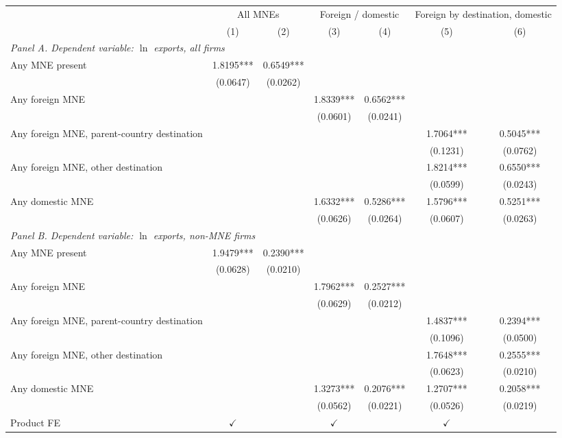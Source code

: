 \begin{tabular}{lcccccc} \hline
 & \multicolumn{2}{c}{All MNEs} & \multicolumn{2}{c}{Foreign / domestic} & \multicolumn{2}{c}{Foreign by destination, domestic} \\
 & (1) & (2) & (3) & (4) & (5) & (6) \\ \hline
\multicolumn{7}{l}{\textit{Panel A. Dependent variable: $\ln$ exports, all firms}} \\
Any MNE present & 1.8195*** & 0.6549*** &  &  &  &  \\
 & (0.0647) & (0.0262) &  &  &  &  \\
Any foreign MNE &  &  & 1.8339*** & 0.6562*** &  &  \\
 &  &  & (0.0601) & (0.0241) &  &  \\
Any foreign MNE, parent-country destination &  &  &  &  & 1.7064*** & 0.5045*** \\
 &  &  &  &  & (0.1231) & (0.0762) \\
Any foreign MNE, other destination &  &  &  &  & 1.8214*** & 0.6550*** \\
 &  &  &  &  & (0.0599) & (0.0243) \\
Any domestic MNE &  &  & 1.6332*** & 0.5286*** & 1.5796*** & 0.5251*** \\
 &  &  & (0.0626) & (0.0264) & (0.0607) & (0.0263) \\
\midrule
\multicolumn{7}{l}{\textit{Panel B. Dependent variable: $\ln$ exports, non-MNE firms}} \\
Any MNE present & 1.9479*** & 0.2390*** &  &  &  &  \\
 & (0.0628) & (0.0210) &  &  &  &  \\
Any foreign MNE &  &  & 1.7962*** & 0.2527*** &  &  \\
 &  &  & (0.0629) & (0.0212) &  &  \\
Any foreign MNE, parent-country destination &  &  &  &  & 1.4837*** & 0.2394*** \\
 &  &  &  &  & (0.1096) & (0.0500) \\
Any foreign MNE, other destination &  &  &  &  & 1.7648*** & 0.2555*** \\
 &  &  &  &  & (0.0623) & (0.0210) \\
Any domestic MNE &  &  & 1.3273*** & 0.2076*** & 1.2707*** & 0.2058*** \\
 &  &  & (0.0562) & (0.0221) & (0.0526) & (0.0219) \\
\hline
Product FE & $\checkmark$ &  & $\checkmark$ &  & $\checkmark$ &  \\

\end{tabular}

